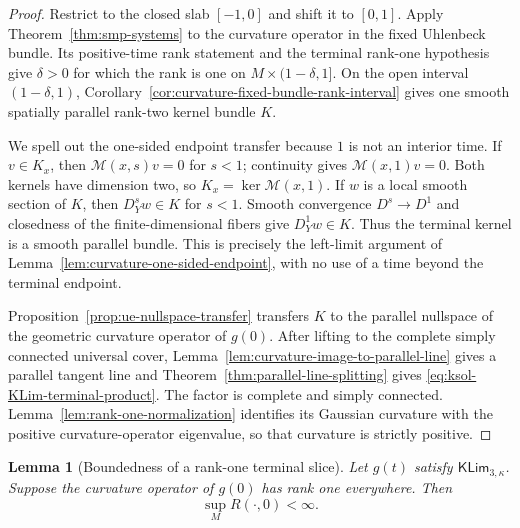 \documentclass[10pt]{coll-l}
\newtheorem{lemma}[theorem]{Lemma}
\theoremstyle{definition}
\theoremstyle{remark}
\numberwithin{section}{chapter}
\numberwithin{equation}{chapter}
\begin{document}
\begin{proof}
Restrict to the closed slab $[-1,0]$ and shift it to $[0,1]$.  Apply
Theorem~\ref{thm:smp-systems} to the curvature operator in the fixed
Uhlenbeck bundle.  Its positive-time rank statement and the terminal
rank-one hypothesis give $\delta>0$ for which the rank is one on
$M\times(1-\delta,1]$.  On the open interval $(1-\delta,1)$,
Corollary~\ref{cor:curvature-fixed-bundle-rank-interval} gives one smooth
spatially parallel rank-two kernel bundle $K$.

We spell out the one-sided endpoint transfer because $1$ is not an
interior time.  If $v\in K_x$, then $\mathcal M(x,s)v=0$ for $s<1$;
continuity gives $\mathcal M(x,1)v=0$.  Both kernels have dimension two,
so $K_x=\ker\mathcal M(x,1)$.  If $w$ is a local smooth section of $K$,
then $D_Y^sw\in K$ for $s<1$.  Smooth convergence $D^s\to D^1$ and
closedness of the finite-dimensional fibers give $D_Y^1w\in K$.  Thus the
terminal kernel is a smooth parallel bundle.  This is precisely the
left-limit argument of Lemma~\ref{lem:curvature-one-sided-endpoint}, with
no use of a time beyond the terminal endpoint.

Proposition~\ref{prop:ue-nullspace-transfer} transfers $K$ to the parallel
nullspace of the geometric curvature operator of $g(0)$.  After lifting to
the complete simply connected universal cover,
Lemma~\ref{lem:curvature-image-to-parallel-line} gives a parallel tangent
line and Theorem~\ref{thm:parallel-line-splitting} gives
\eqref{eq:ksol-KLim-terminal-product}.  The factor is complete and simply
connected.  Lemma~\ref{lem:rank-one-normalization} identifies its Gaussian
curvature with the positive curvature-operator eigenvalue, so that
curvature is strictly positive.
\end{proof}

\begin{lemma}[Boundedness of a rank-one terminal slice]
\label{lem:ksol-rank-one-terminal-bounded}
Let $g(t)$ satisfy $\mathsf{KLim}_{3,\kappa}$.  Suppose the curvature
operator of $g(0)$ has rank one everywhere.  Then
\begin{equation}
                              \sup_MR(\cdot,0)<\infty.  \label{eq:ksol-rank-one-terminal-bound}
\end{equation}
\end{lemma}
\end{document}
